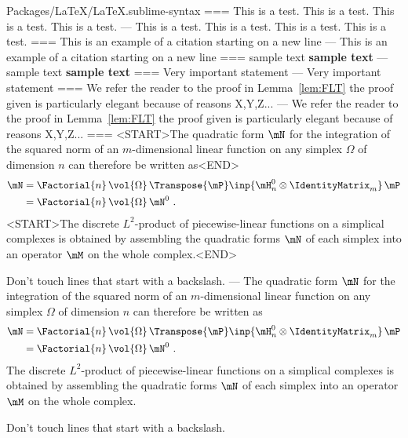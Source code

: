 Packages/LaTeX/LaTeX.sublime-syntax
===
This is a test. This is a test. This is a test. This is a test. %
---
This is a test. This is a test. This is a test. This is a test. %
===
This is an example of a citation starting on a new line
\cite{Newton1687}
---
This is an example of a citation starting on a new line \cite{Newton1687}
===
sample text
\textbf{sample text}
---
sample text \textbf{sample text}
===
Very important statement
---
Very important statement
===
We refer the reader to the proof in Lemma~\ref{lem:FLT}
the proof given is particularly elegant because of reasons X,Y,Z...
---
We refer the reader to the proof in Lemma~\ref{lem:FLT}
the proof given is particularly elegant because of reasons X,Y,Z...
===
<START>The quadratic form $\mN$ for the integration of the squared norm of an $m$-dimensional linear function on any simplex $\Omega$ of dimension $n$ can therefore be written as<END>
\begin{align}
\label{eq:integration_matrix}
\mN &= \Factorial{n} \, \vol{\Omega} \, \Transpose{\mP} \inp{\mH^0_n \otimes \IdentityMatrix_m} \, \mP \nonumber\\%
    &= \Factorial{n} \, \vol{\Omega} \, \mN^0~.
\end{align}
<START>The discrete $L^2$-product of piecewise-linear functions on a simplical complexes is obtained by assembling the quadratic forms $\mN$ of each simplex into an operator $\mM$ on the whole complex.<END>

Don't touch lines that start with a backslash.
---
The quadratic form $\mN$ for the integration of the squared norm of an
$m$-dimensional linear function on any simplex $\Omega$ of dimension $n$ can
therefore be written as
\begin{align}
\label{eq:integration_matrix}
\mN &= \Factorial{n} \, \vol{\Omega} \, \Transpose{\mP} \inp{\mH^0_n \otimes \IdentityMatrix_m} \, \mP \nonumber\\%
    &= \Factorial{n} \, \vol{\Omega} \, \mN^0~.
\end{align}
The discrete $L^2$-product of piecewise-linear functions on a simplical
complexes is obtained by assembling the quadratic forms $\mN$ of each simplex
into an operator $\mM$ on the whole complex.

Don't touch lines that start with a backslash.
